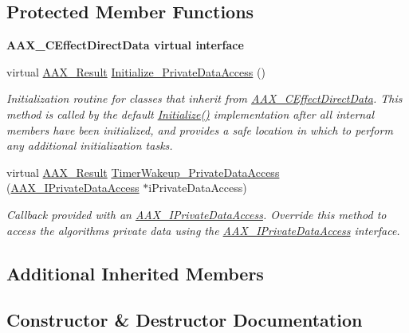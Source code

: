 \subsection*{Protected Member Functions}
\begin{Indent}\textbf{ A\+A\+X\+\_\+\+C\+Effect\+Direct\+Data virtual interface}\par
\begin{DoxyCompactItemize}
\item 
virtual \mbox{\hyperlink{a00392_a4d8f69a697df7f70c3a8e9b8ee130d2f}{A\+A\+X\+\_\+\+Result}} \mbox{\hyperlink{a01473_ac33b9e51d38ffc375df379018abd5899}{Initialize\+\_\+\+Private\+Data\+Access}} ()
\begin{DoxyCompactList}\small\item\em Initialization routine for classes that inherit from \mbox{\hyperlink{a01473}{A\+A\+X\+\_\+\+C\+Effect\+Direct\+Data}}. This method is called by the default \mbox{\hyperlink{a01473_ad89ee93781539d8df3b0710a186c7e0d}{Initialize()}} implementation after all internal members have been initialized, and provides a safe location in which to perform any additional initialization tasks. \end{DoxyCompactList}\item 
virtual \mbox{\hyperlink{a00392_a4d8f69a697df7f70c3a8e9b8ee130d2f}{A\+A\+X\+\_\+\+Result}} \mbox{\hyperlink{a01473_addd263d3a410d5c26148cee306cc7297}{Timer\+Wakeup\+\_\+\+Private\+Data\+Access}} (\mbox{\hyperlink{a01865}{A\+A\+X\+\_\+\+I\+Private\+Data\+Access}} $\ast$i\+Private\+Data\+Access)
\begin{DoxyCompactList}\small\item\em Callback provided with an \mbox{\hyperlink{a01865}{A\+A\+X\+\_\+\+I\+Private\+Data\+Access}}. Override this method to access the algorithm\textquotesingle{}s private data using the \mbox{\hyperlink{a01865}{A\+A\+X\+\_\+\+I\+Private\+Data\+Access}} interface. \end{DoxyCompactList}\end{DoxyCompactItemize}
\end{Indent}
\subsection*{Additional Inherited Members}


\subsection{Constructor \& Destructor Documentation}
\mbox{\label{a01473_a4a3e96ae0ad1f0be1813b27657f66fd9}} 
